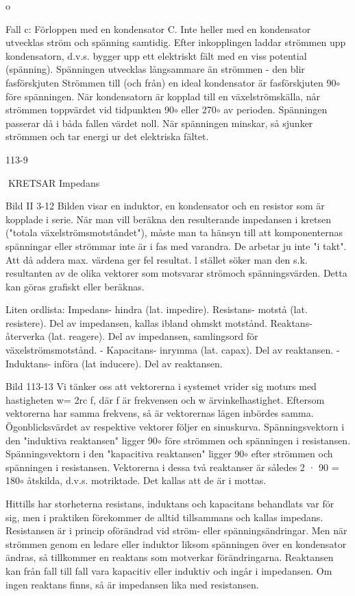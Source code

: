 {o

Fall c: Förloppen med en kondensator C.
Inte heller med en kondensator utvecklas
ström och spänning samtidig. Efter inkopplingen laddar strömmen upp kondensatorn,
d.v.s. bygger upp ett elektriskt fält med en
viss potential (spänning). Spänningen utvecklas långsammare än strömmen - den
blir fasförskjuten
Strömmen till (och från) en ideal kondensator är fasförskjuten 90\(\circ\) före spänningen.
När kondensatorn är kopplad till en växelströmskälla, når strömmen toppvärdet vid
tidpunkten 90\(\circ\) eller 270\(\circ\) av perioden. Spänningen passerar då i båda fallen värdet noll.
När spänningen minskar, så sjunker strömmen och tar energi ur det elektriska fältet.

113-9

KRETSAR
Impedans

Bild II 3-12
Bilden visar en induktor, en kondensator
och en resistor som är kopplade i serie. När
man vill beräkna den resulterande impedansen i kretsen ("totala växelströmsmotståndet"), måste man ta hänsyn till att komponenternas spänningar eller strömmar inte är
i fas med varandra. De arbetar ju inte "i takt".
Att då addera max. värdena ger fel resultat. l stället söker man den s.k. resultanten
av de olika vektorer som motsvarar strömoch spänningsvärden.
Detta kan göras grafiskt eller beräknas.

Liten ordlista:
Impedans- hindra
(lat. impedire).
Resistans- motstå
(lat. resistere).
Del av impedansen,
kallas ibland ohmskt motstånd.
Reaktans- återverka
(lat. reagere).
Del av impedansen,
samlingsord för växelströmsmotstånd.
- Kapacitans- inrymma (lat. capax).
Del av reaktansen.
- Induktans- införa
(lat inducere).
Del av reaktansen.

Bild 113-13
Vi tänker oss att vektorerna i systemet
vrider sig moturs med hastigheten w= 2rc f,
där f är frekvensen och w ärvinkelhastighet.
Eftersom vektorerna har samma frekvens,
så är vektorernas lägen inbördes samma.
Ögonblicksvärdet av respektive vektorer följer en sinuskurva.
Spänningsvektorn i den "induktiva reaktansen" ligger 90\(\circ\) före strömmen och spänningen i resistansen. Spänningsvektorn i
den "kapacitiva reaktansen" ligger 90\(\circ\) efter
strömmen och spänningen i resistansen.
Vektorerna i dessa två reaktanser är således 2 · 90 = 180\(\circ\) åtskilda, d.v.s. motriktade.
Det kallas att de är i mottas.

Hittills har storheterna resistans, induktans
och kapacitans behandlats var för sig, men
i praktiken förekommer de alltid tillsammans
och kallas impedans.
Resistansen är i princip oförändrad vid
ström- eller spänningsändringar. Men när
strömmen genom en ledare eller induktor
liksom spänningen över en kondensator ändras, så tillkommer en reaktans som motverkar förändringarna.
Reaktansen kan från fall till fall vara kapacitiv eller induktiv och ingår i impedansen.
Om ingen reaktans finns, så är impedansen
lika med resistansen.

}
